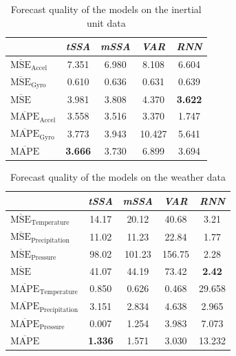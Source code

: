 \documentclass[referee, pdflatex, sn-mathphys-num]{sn-jnl}
\theoremstyle{definition}
\theoremstyle{plain}
\begin{document}
	\def\arraystretch{1.2}
	\begin{table}[h]
		\centering
		\caption{Forecast quality of the models on the inertial unit data}\label{tab:pred_res_motion}
		\begin{tabular}{|l|c|c|c|c|}
			\hline
			\diagbox{Metric}{Method} & \textit{tSSA}                & \textit{mSSA} & \textit{VAR} & \textit{RNN} \\ \hline
			$ \overline{\text{MSE}}_{\text{Accel}} $  & 7.351          & 6.980 & 8.108  & 6.604          \\ \hline
			$ \overline{\text{MSE}}_{\text{Gyro}} $   & 0.610          & 0.636 & 0.631  & 0.639          \\ \hline
			$ \overline{\text{MSE}} $         & 3.981          & 3.808 & 4.370  & \textbf{3.622} \\ \hline
			$ \overline{\text{MAPE}}_{\text{Accel}} $ & 3.558          & 3.516 & 3.370  & 1.747          \\ \hline
			$ \overline{\text{MAPE}}_{\text{Gyro}} $  & 3.773          & 3.943 & 10.427 & 5.641          \\ \hline
			$ \overline{\text{MAPE}} $        & \textbf{3.666} & 3.730 & 6.899  & 3.694          \\ \hline
		\end{tabular}
	\end{table}
	
	
	\def\arraystretch{1.2}
	\begin{table}[h]
		\centering
		\caption{Forecast quality of the models on the weather data}\label{tab:pred_res_weather}
		\begin{tabular}{|l|c|c|c|c|}
			\hline
			\diagbox[width=3.3cm]{Metric}{Method} & \textit{tSSA}  & \textit{mSSA} & \textit{VAR} & \textit{RNN} \\ \hline
			$ \overline{\text{MSE}}_{\text{Temperature}} $ & 14.17          & 20.12          & 40.68         &  3.21        \\ \hline
			$ \overline{\text{MSE}}_{\text{Precipitation}} $ & 11.02           & 11.23          & 22.84         & 1.77        \\ \hline
			$ \overline{\text{MSE}}_{\text{Pressure}} $     & 98.02           & 101.23          &  156.75       & 2.28         \\ \hline
			$ \overline{\text{MSE}} $             & 41.07  & 44.19         & 73.42         & \textbf{2.42}       \\ \hline
			$ \overline{\text{MAPE}}_{\text{Temperature}} $        & 0.850          & 0.626        &  0.468       & 29.658        \\ \hline
			$ \overline{\text{MAPE}}_{\text{Precipitation}} $             & 3.151          & 2.834         &  4.638       & 2.965        \\ \hline
			$ \overline{\text{MAPE}}_{\text{Pressure}} $             & 0.007         & 1.254         &  3.983       &  7.073       \\ \hline
			$ \overline{\text{MAPE}} $                    & \textbf{1.336} & 1.571         &  3.030       & 13.232        \\ \hline
		\end{tabular}
	\end{table}
	
\end{document}
